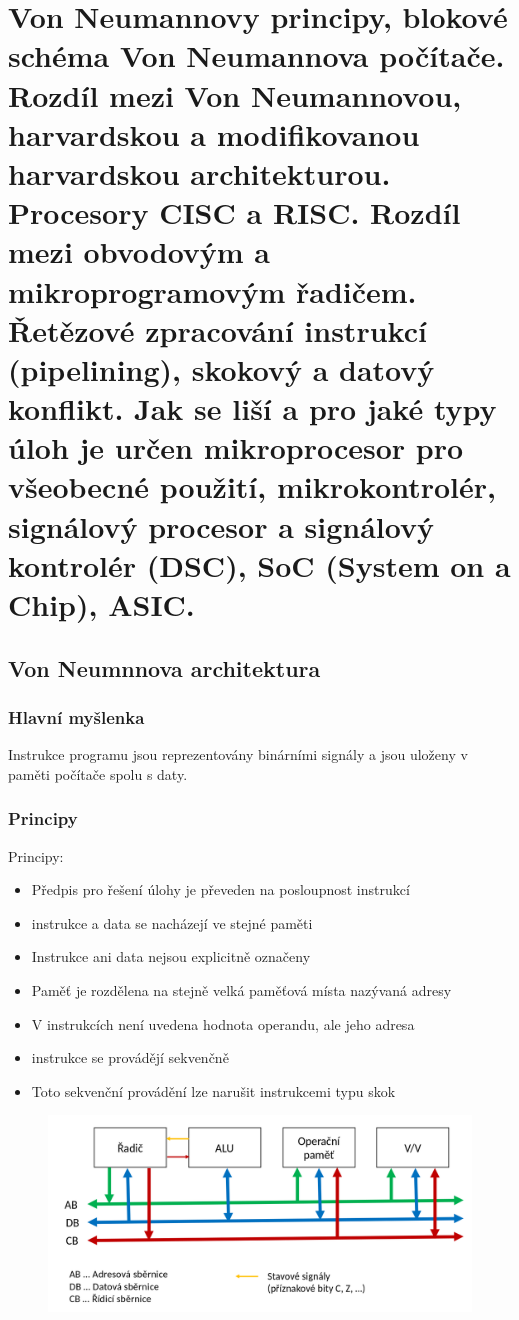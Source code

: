     \section{Von Neumannovy principy, blokové schéma Von Neumannova počítače. Rozdíl mezi Von Neumannovou, harvardskou a modifikovanou harvardskou architekturou. Procesory CISC a RISC. Rozdíl mezi obvodovým a mikroprogramovým řadičem. Řetězové zpracování instrukcí (pipelining), skokový a datový konflikt. Jak se liší a pro jaké typy úloh je určen mikroprocesor pro všeobecné použití, mikrokontrolér, signálový procesor a signálový kontrolér (DSC), SoC (System on a Chip), ASIC.}
\subsection{Von Neumnnova architektura}
\subsubsection*{Hlavní myšlenka}
Instrukce programu jsou reprezentovány binárními signály a jsou uloženy v paměti počítače spolu s daty. \\
\subsubsection*{Principy}
Principy:
\begin{itemize}
    \item Předpis pro řešení úlohy je převeden na posloupnost instrukcí
    \item instrukce a data se nacházejí ve stejné paměti
    \item Instrukce ani data nejsou explicitně označeny
    \item Paměť je rozdělena na stejně velká paměťová místa nazývaná adresy
    \item V instrukcích není uvedena hodnota operandu, ale jeho adresa
    \item instrukce se provádějí sekvenčně
    \item Toto sekvenční provádění lze narušit instrukcemi typu skok
\end{itemize}

\begin{figure}[h!]
    \centering
    \includegraphics[width = \textwidth]{img/VonNeumann.png}
\end{figure}

